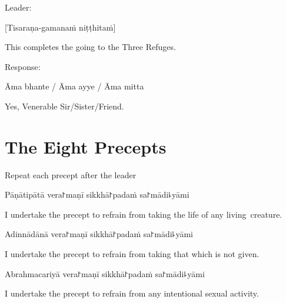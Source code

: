 \begin{instruction}
  Leader:
\end{instruction}

[Tisaraṇa-gamanaṁ niṭṭhitaṁ]

\begin{english}
  This completes the going to the Three Refuges.
\end{english}

\begin{instruction}
  Response:
\end{instruction}

Āma bhante / Āma ayye / Āma mitta

\begin{english}
  Yes, Venerable Sir/Sister/Friend.
\end{english}

\chapter{The Eight Precepts}%

\begin{instruction}
  Repeat each precept after the leader
\end{instruction}

\begin{precept}
  \setcounter{enumi}{0}
  \item Pāṇātipātā vera꜓maṇī sikkhā꜓padaṁ sa꜓mādi꜕yāmi
\end{precept}

\begin{english}
  I undertake the precept to refrain from taking the life of any living~creature.
\end{english}

\begin{precept}
  \setcounter{enumi}{1}
  \item Adinnādānā vera꜓maṇī sikkhā꜓padaṁ sa꜓mādi꜕yāmi
\end{precept}

\begin{english}
  I undertake the precept to refrain from taking that which is not given.
\end{english}

\begin{precept}
  \setcounter{enumi}{2}
  \item Abrahmacariyā vera꜓maṇī sikkhā꜓padaṁ sa꜓mādi꜕yāmi
\end{precept}

\begin{english}
  I undertake the precept to refrain from any intentional sexual activity.
\end{english}

